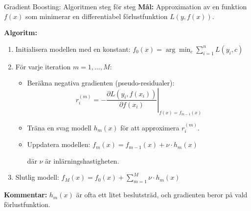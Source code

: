 \documentclass[10pt,english]{beamer}
\begin{document}
\begin{frame}{Gradient Boosting: Algoritmen steg för steg}
  \textbf{Mål:} Approximation av en funktion $f(x)$ som minimerar en differentiabel förlustfunktion $L(y, f(x))$.


  \textbf{Algoritm:}
  \begin{enumerate}
    \item Initialisera modellen med en konstant: $f_0(x) = \arg\min_c \sum_{i=1}^n L(y_i, c)$
     \vspace{0.1cm}
    \item För varje iteration $m = 1, \dots, M$:
    \begin{itemize}
      \item Beräkna negativa gradienten (pseudo-residualer):
      \[
        r_i^{(m)} = -\left.\frac{\partial L(y_i, f(x_i))}{\partial f(x_i)}\right|_{f(x) = f_{m-1}(x)}
      \]
      
      \item Träna en svag modell $h_m(x)$ för att approximera $r_i^{(m)}$.
      
      \item Uppdatera modellen: $f_m(x) = f_{m-1}(x) + \nu \cdot h_m(x)$

      där $\nu$ är inlärningshastigheten.
    \end{itemize}
     \vspace{0.1cm}
    
    \item Slutlig modell: $f_M(x) = f_0(x) + \sum_{m=1}^M \nu \cdot h_m(x)$

  \end{enumerate}

  
  \textbf{Kommentar:} $h_m(x)$ är ofta ett litet beslutsträd, och gradienten beror på vald förlustfunktion.
\end{frame}
\end{document}
